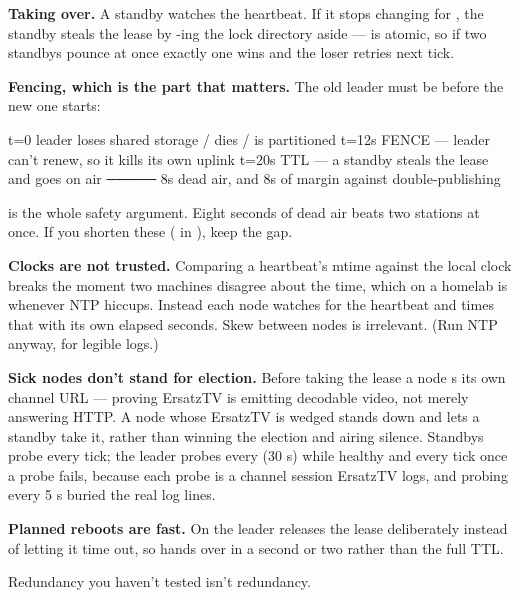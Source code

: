 \documentclass[fontpath=fonts/,logopath=logo/]{riposte-doc}
\begin{document}
\textbf{Taking over.} A standby watches the heartbeat. If it stops changing for , the standby steals the lease by -ing the lock directory aside —  is atomic, so if two standbys pounce at once exactly one wins and the loser retries next tick.

\textbf{Fencing, which is the part that matters.} The old leader must be  before the new one starts:

\ripcodeopen
{}
\begin{ripcodeblock}
   t=0     leader loses shared storage / dies / is partitioned
   t=12s   FENCE — leader can't renew, so it kills its own uplink
   t=20s   TTL   — a standby steals the lease and goes on air
           ─────
            8s   dead air, and 8s of margin against double-publishing
\end{ripcodeblock}
\ripcodesizereset\ripcodeclose

 is the whole safety argument. Eight seconds of dead air beats two stations at once. If you shorten these ( in ), keep the gap.

\textbf{Clocks are not trusted.} Comparing a heartbeat's mtime against the local clock breaks the moment two machines disagree about the time, which on a homelab is whenever NTP hiccups. Instead each node watches for the heartbeat  and times that with its own elapsed seconds. Skew between nodes is irrelevant. (Run NTP anyway, for legible logs.)

\textbf{Sick nodes don't stand for election.} Before taking the lease a node s its own channel URL — proving ErsatzTV is emitting decodable video, not merely answering HTTP. A node whose ErsatzTV is wedged stands down and lets a standby take it, rather than winning the election and airing silence. Standbys probe every tick; the leader probes every  (30 s) while healthy and every tick once a probe fails, because each probe is a channel session ErsatzTV logs, and probing every 5 s buried the real log lines.

\textbf{Planned reboots are fast.} On  the leader releases the lease deliberately instead of letting it time out, so  hands over in a second or two rather than the full TTL.



Redundancy you haven't tested isn't redundancy.
\end{document}
